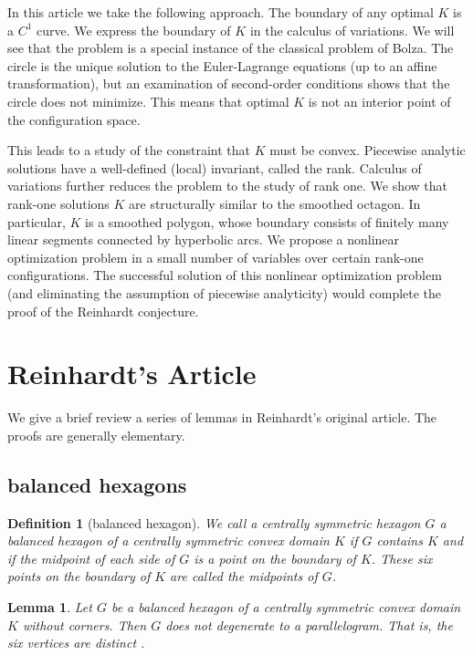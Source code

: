 \documentclass[11pt]{amsart}
\newtheorem{definition}[equation]{Definition}
\newtheorem{lemma}[equation]{Lemma}
\begin{document}
In this article we take the following approach.  The boundary of any
optimal $K$ is a $C^1$ curve.  We express the boundary of $K$ in the
calculus of variations.  We will see that the problem is a special
instance of the classical problem of Bolza.  The circle is the unique
solution to the Euler-Lagrange equations (up to an affine
transformation), but an examination of second-order conditions shows
that the circle does not minimize.  This means that optimal $K$ is not
an interior point of the configuration space.


This leads to a study of the constraint that $K$ must be convex.
Piecewise analytic solutions have a well-defined (local) invariant,
called the rank.  Calculus of variations further reduces the problem
to the study of rank one.  We show that rank-one solutions $K$ are
structurally similar to the smoothed octagon.  In particular, $K$ is a
smoothed polygon, whose boundary consists of finitely many linear
segments connected by hyperbolic arcs.  We propose a nonlinear optimization
problem in a small number of variables over certain rank-one
configurations.  The successful solution of this nonlinear
optimization problem (and eliminating the assumption of piecewise
analyticity) would complete the proof of the Reinhardt conjecture.




\section{Reinhardt's Article}\label{sec:rein}

We give a brief review a series of lemmas in Reinhardt's original article.
The proofs are generally elementary.


\subsection{balanced hexagons}

%
\begin{definition}[balanced hexagon]
  We call a centrally symmetric hexagon $G$ a {\it balanced hexagon}
  of a centrally symmetric convex domain $K$ if $G$ contains $K$ and
  if the midpoint of each side of $G$ is a point on the boundary of
  $K$.  These six points on the boundary of $K$ are called the
  midpoints of $G$.
\end{definition}


\begin{lemma}\label{lemma:parallel} 
  Let $G$ be a balanced hexagon of a centrally symmetric convex domain
  $K$ without corners.  Then $G$ does not degenerate to a
  parallelogram.  That is, the six vertices are distinct \cite{Reinhardt:1934}.
\end{lemma}
\end{document}
